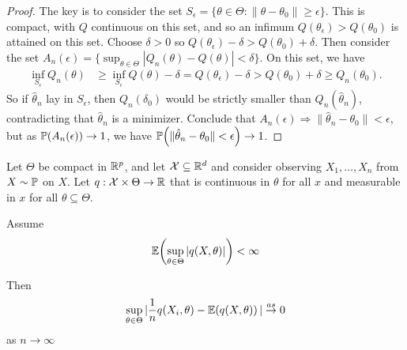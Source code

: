 \begin{proof}
  The key is to consider the set $S_{\epsilon} = \{ \theta \in \Theta
  : \| \theta - \theta_{0} \| \geq \epsilon \} $.  This is compact,
  with $Q$ continuous on this set, and so an infimum
  $Q(\theta_{\epsilon}) > Q(\theta_{0})$ is attained on this set.
  Choose $\delta > 0$ so $Q(\theta_{\epsilon}) - \delta >
  Q(\theta_{0}) + \delta$.  Then consider the set $A_{n}(\epsilon) =
  \{ \sup_{\theta \in \Theta} | Q_{n}(\theta) - Q(\theta) | < \delta
  \} $.  On this set, we have
  \begin{align}
    \label{eq:43}
    \inf_{S_{\epsilon}} Q_{n}(\theta) &\geq \inf_{S_{\epsilon}}
    Q(\theta) - \delta = Q(\theta_{\epsilon}) - \delta > Q(\theta_{0})
    + \delta \geq Q_{n}(\theta_{0}).
  \end{align}
  So if $\hat \theta_{n}$ lay in $S_{\epsilon}$, then
  $Q_{n}(\delta_{0})$ would be strictly smaller than $Q_{n}(\hat
  \theta_{n})$, contradicting that $\hat \theta_{n}$ is a minimizer.
  Conclude that $A_{n}(\epsilon) \Rightarrow \| \hat \theta_{n} -
  \theta_{0} \| < \epsilon$, but as $\Prob{A_{n}(\epsilon)}
  \rightarrow 1$, we have $\Prob{\| \hat \theta_{n} - \theta_{0} \| <
    \epsilon} \rightarrow 1$.
\end{proof}

\begin{thm}
  Let $\Theta$ be compact in $\mathbb{R}^{p}$, and let $\mathcal{X} \subseteq \mathbb{R}^{d}$
  and consider observing $X_{1}, \dots, X_{n}$ \iid from $X \sim
  \Prob$ on $X$.  Let $q: \mathcal{X} \times \Theta \rightarrow \mathbb{R}$
  that is continuous in $\theta$ for all $x$ and measurable in $x$ for
  all $\theta \subseteq \Theta$.

  Assume
  \begin{equation}
    \label{eq:50}
    \E{\sup_{\theta \in \Theta} | q(X, \theta)|} < \infty
  \end{equation}

  Then
  \begin{equation}
    \label{eq:51}
    \sup_{\theta \in \Theta} | \frac{1}{n} q(X_{i}, \theta) - \E{q(X,
      \theta)} | \cas 0
  \end{equation} as $n \rightarrow \infty$
\end{thm}

